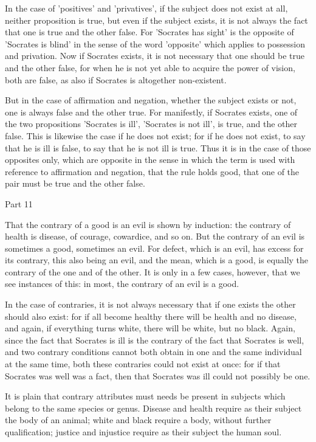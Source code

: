 In the case of 'positives' and 'privatives', if the subject does not
exist at all, neither proposition is true, but even if the subject
exists, it is not always the fact that one is true and the other false.
For 'Socrates has sight' is the opposite of 'Socrates is blind' in the
sense of the word 'opposite' which applies to possession and privation.
Now if Socrates exists, it is not necessary that one should be true and
the other false, for when he is not yet able to acquire the power of
vision, both are false, as also if Socrates is altogether non-existent.

But in the case of affirmation and negation, whether the subject exists
or not, one is always false and the other true. For manifestly, if
Socrates exists, one of the two propositions 'Socrates is ill',
'Socrates is not ill', is true, and the other false. This is likewise
the case if he does not exist; for if he does not exist, to say that he
is ill is false, to say that he is not ill is true. Thus it is in the
case of those opposites only, which are opposite in the sense in which
the term is used with reference to affirmation and negation, that the
rule holds good, that one of the pair must be true and the other false.



Part 11

That the contrary of a good is an evil is shown by induction: the
contrary of health is disease, of courage, cowardice, and so on. But
the contrary of an evil is sometimes a good, sometimes an evil. For
defect, which is an evil, has excess for its contrary, this also being
an evil, and the mean, which is a good, is equally the contrary of the
one and of the other. It is only in a few cases, however, that we see
instances of this: in most, the contrary of an evil is a good.

In the case of contraries, it is not always necessary that if one
exists the other should also exist: for if all become healthy there
will be health and no disease, and again, if everything turns white,
there will be white, but no black. Again, since the fact that Socrates
is ill is the contrary of the fact that Socrates is well, and two
contrary conditions cannot both obtain in one and the same individual
at the same time, both these contraries could not exist at once: for if
that Socrates was well was a fact, then that Socrates was ill could not
possibly be one.

It is plain that contrary attributes must needs be present in subjects
which belong to the same species or genus. Disease and health require
as their subject the body of an animal; white and black require a body,
without further qualification; justice and injustice require as their
subject the human soul.

